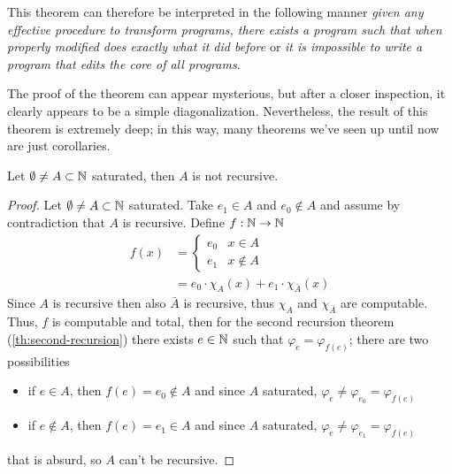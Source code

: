 This theorem can therefore be interpreted in the following manner
\emph{given any effective procedure to transform programs, there exists a
program such that when properly modified does exactly what it did
before} or \emph{it is impossible to write a program that edits the core of
all programs}.

The proof of the theorem can appear mysterious, but after a closer
inspection, it clearly appears to be a simple diagonalization.
Nevertheless, the result of this theorem is extremely
deep; in this way, many theorems we've seen up until now are just
corollaries.
\begin{corollary}
  Let $\emptyset \neq A \subset \mathbb{N}$ saturated, then
  $A$ is not recursive.
  \begin{proof}
    Let $\emptyset \neq A \subset \mathbb{N}$ saturated.
    Take $e_1\in A$ and $e_0\notin A$ and
    assume by contradiction that $A$ is recursive.
    Define $f : \mathbb{N} \to \mathbb{N}$
    \begin{align*}
      f(x) &= \begin{cases}
        e_0 & x \in A \\
        e_1 & x \notin A
      \end{cases} \\
            &= e_0 \cdot \chi_A(x) + e_1 \cdot \chi_{\bar{A}}(x)
    \end{align*}
    Since $A$ is recursive then also $\bar{A}$ is recursive, thus $\chi_A$ and $\chi_{\bar{A}}$ are computable.
    Thus, $f$ is computable and total, then for the second recursion
    theorem (\ref{th:second-recursion}) there exists $e\in\mathbb{N}$ such that
    $\varphi_e = \varphi_{f(e)}$; there are two possibilities
    \begin{itemize}
      \item if $e\in A$, then $f(e)=e_0 \notin A$ and since $A$ saturated, $\varphi_e \neq \varphi_{e_0} = \varphi_{f(e)}$
      \item if $e\notin A$, then $f(e)=e_1 \in A$ and since $A$ saturated, $\varphi_e \neq \varphi_{e_1} = \varphi_{f(e)}$
    \end{itemize}
    that is absurd, so $A$ can't be recursive.
  \end{proof}
\end{corollary}

